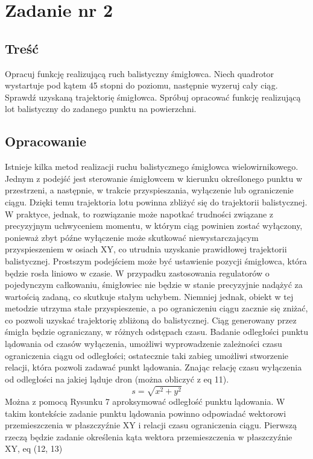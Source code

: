 \documentclass[polish,11pt,a4paper]{article}
\begin{document}
\section*{Zadanie nr 2}
\subsection*{Treść}
Opracuj funkcję realizującą ruch balistyczny śmigłowca. Niech quadrotor wystartuje
pod kątem 45 stopni do poziomu, następnie wyzeruj cały ciąg. Sprawdź uzyskaną trajektorię śmigłowca.
Spróbuj opracować funkcję realizującą lot balistyczny do zadanego punktu na powierzchni.

\subsection*{Opracowanie}
Istnieje kilka metod realizacji ruchu balistycznego śmigłowca wielowirnikowego. Jednym z podejść jest sterowanie śmigłowcem w kierunku określonego punktu w przestrzeni, a następnie, w trakcie przyspieszania, wyłączenie lub ograniczenie ciągu. Dzięki temu trajektoria lotu powinna zbliżyć się do trajektorii balistycznej. W praktyce, jednak, to rozwiązanie może napotkać trudności związane z precyzyjnym uchwyceniem momentu, w którym ciąg powinien zostać wyłączony, ponieważ zbyt późne wyłączenie może skutkować niewystarczającym przyspieszeniem w osiach XY, co utrudnia uzyskanie prawidłowej trajektorii balistycznej. Prostszym podejściem może być ustawienie pozycji śmigłowca, która będzie rosła liniowo w czasie. W przypadku zastosowania regulatorów o pojedynczym całkowaniu, śmigłowiec nie będzie w stanie precyzyjnie nadążyć za wartością zadaną, co skutkuje stałym uchybem. Niemniej jednak, obiekt w tej metodzie utrzyma stałe przyspieszenie, a po ograniczeniu ciągu zacznie się zniżać, co pozwoli uzyskać trajektorię zbliżoną do balistycznej. 
Ciąg generowany przez śmigła będzie ograniczany, w różnych odstępach czasu. Badanie odległości punktu
lądowania od czasów wyłączenia, umożliwi wyprowadzenie zależności czasu ograniczenia ciągu od odległości;
ostatecznie taki zabieg umożliwi stworzenie relacji, która pozwoli zadawać punkt lądowania.
Znając relację czasu wyłączenia od odległości na jakiej ląduje dron (można obliczyć z eq 11).
\begin{equation}
	s = \sqrt{x^{2}+y^{2}}
\end{equation}
Można z pomocą Rysunku 7 aproksymować odległość punktu lądowania. W takim kontekście zadanie punktu lądowania powinno odpowiadać
wektorowi przemieszczenia w płaszczyźnie XY i relacji czasu ograniczenia ciągu. Pierwszą rzeczą będzie zadanie określenia kąta wektora przemieszczenia
w płaszczyźnie XY, eq (12, 13)
\end{document}
